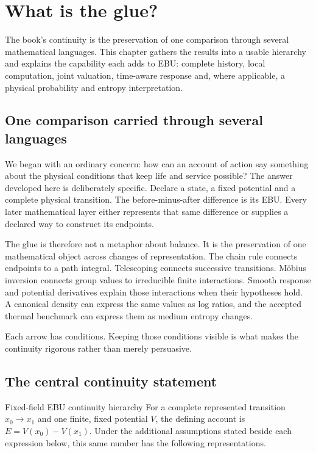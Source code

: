 \chapter{What is the glue?}\label{ch:continuity}

The book's continuity is the preservation of one comparison through several mathematical languages. This chapter gathers the results into a usable hierarchy and explains the capability each adds to EBU: complete history, local computation, joint valuation, time-aware response and, where applicable, a physical probability and entropy interpretation.


\section{One comparison carried through several languages}
We began with an ordinary concern: how can an account of action say something about the physical conditions that keep life and service possible? The answer developed here is deliberately specific. Declare a state, a fixed potential and a complete physical transition. The before-minus-after difference is its EBU. Every later mathematical layer either represents that same difference or supplies a declared way to construct its endpoints.

The glue is therefore not a metaphor about balance. It is the preservation of one mathematical object across changes of representation. The chain rule connects endpoints to a path integral. Telescoping connects successive transitions. Möbius inversion connects group values to irreducible finite interactions. Smooth response and potential derivatives explain those interactions when their hypotheses hold. A canonical density can express the same values as log ratios, and the accepted thermal benchmark can express them as medium entropy changes.

Each arrow has conditions. Keeping those conditions visible is what makes the continuity rigorous rather than merely persuasive.


\section{The central continuity statement}
\begin{theorem}{Fixed-field EBU continuity hierarchy}\label{thm:central}
For a complete represented transition $x_0\to x_1$ and one finite, fixed potential $V$, the defining account is $E=V(x_0)-V(x_1)$. Under the additional assumptions stated beside each expression below, this same number has the following representations.
\end{theorem}

